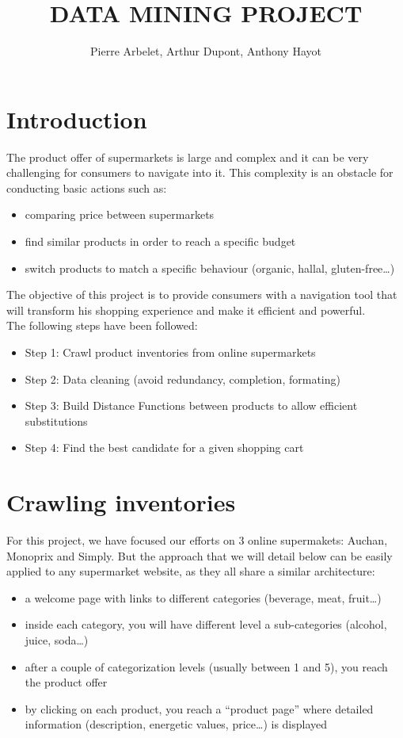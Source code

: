 \documentclass{article}
\title{DATA MINING PROJECT}
\author{Pierre Arbelet, Arthur Dupont, Anthony Hayot}
\begin{document}
    
    
    \maketitle
    
    

    

    \section{Introduction}


    The product offer of supermarkets is large and complex and it can be
very challenging for consumers to navigate into it. This complexity is
an obstacle for conducting basic actions such as: 
\begin{itemize}
\item comparing price between supermarkets 
\item find similar products in order to reach a specific budget 
\item switch products to match a specific behaviour (organic, hallal, gluten-free\ldots{})
\end{itemize}

The objective of this project is to provide consumers with a navigation
tool that will transform his shopping experience and make it efficient and powerful.
\\

The following steps have been followed: 
\begin{itemize}
\item Step 1: Crawl product inventories from online supermarkets 
\item Step 2: Data cleaning (avoid redundancy, completion, formating) 
\item Step 3: Build Distance Functions between products to allow efficient substitutions 
\item Step 4: Find the best candidate for a given shopping cart
\end{itemize}

    \section{Crawling inventories}


    For this project, we have focused our efforts on 3 online supermakets:
Auchan, Monoprix and Simply. But the approach that we will detail below
can be easily applied to any supermarket website, as they all share a
similar architecture: 
\begin{itemize}
\item  a welcome page with links to different categories (beverage, meat, fruit\ldots{}) 
\item inside each category, you will have different level a sub-categories (alcohol, juice, soda\ldots{}) 
\item after a couple of categorization levels (usually between 1 and 5), you reach the product offer
\item by clicking on each product, you reach a ``product page'' where detailed information (description, energetic values, price\ldots{}) is displayed
\end{itemize}
\end{document}
